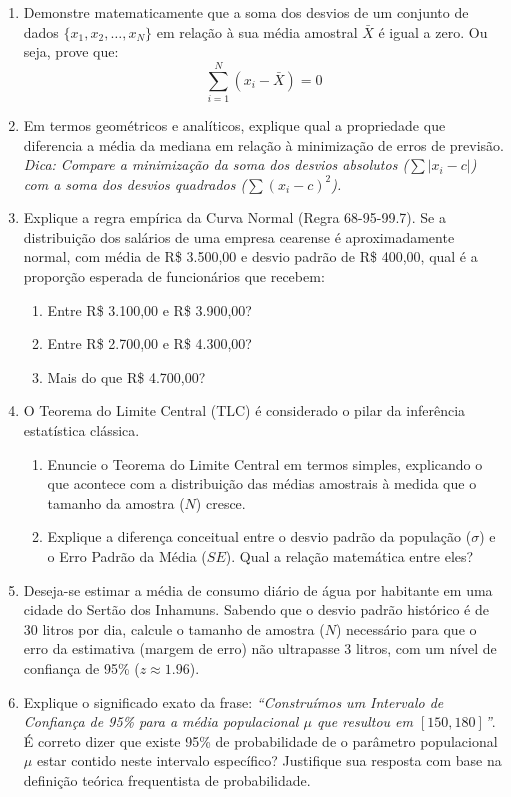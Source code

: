 \documentclass[12pt]{article}
\begin{document}
\begin{enumerate}[label=\textbf{Questão \arabic*}]
    \item Demonstre matematicamente que a soma dos desvios de um conjunto de dados $\{x_1, x_2, \dots, x_N\}$ em relação à sua média amostral $\bar{X}$ é igual a zero. Ou seja, prove que:
    $$\sum_{i=1}^{N} (x_i - \bar{X}) = 0$$

    \item Em termos geométricos e analíticos, explique qual a propriedade que diferencia a média da mediana em relação à minimização de erros de previsão. \\
    \textit{Dica: Compare a minimização da soma dos desvios absolutos ($\sum |x_i - c|$) com a soma dos desvios quadrados ($\sum (x_i - c)^2$).}

    \item Explique a regra empírica da Curva Normal (Regra 68-95-99.7). Se a distribuição dos salários de uma empresa cearense é aproximadamente normal, com média de R\$ 3.500,00 e desvio padrão de R\$ 400,00, qual é a proporção esperada de funcionários que recebem:
    \begin{enumerate}[label=\alph*)]
        \item Entre R\$ 3.100,00 e R\$ 3.900,00?
        \item Entre R\$ 2.700,00 e R\$ 4.300,00?
        \item Mais do que R\$ 4.700,00?
    \end{enumerate}

    \item O Teorema do Limite Central (TLC) é considerado o pilar da inferência estatística clássica. 
    \begin{enumerate}[label=\alph*)]
        \item Enuncie o Teorema do Limite Central em termos simples, explicando o que acontece com a distribuição das médias amostrais à medida que o tamanho da amostra ($N$) cresce.
        \item Explique a diferença conceitual entre o desvio padrão da população ($\sigma$) e o Erro Padrão da Média ($SE$). Qual a relação matemática entre eles?
    \end{enumerate}

    \item Deseja-se estimar a média de consumo diário de água por habitante em uma cidade do Sertão dos Inhamuns. Sabendo que o desvio padrão histórico é de 30 litros por dia, calcule o tamanho de amostra ($N$) necessário para que o erro da estimativa (margem de erro) não ultrapasse 3 litros, com um nível de confiança de 95\% ($z \approx 1.96$).

    \item Explique o significado exato da frase: \textit{``Construímos um Intervalo de Confiança de 95\% para a média populacional $\mu$ que resultou em $[150, 180]$''}. \\
    É correto dizer que existe 95\% de probabilidade de o parâmetro populacional $\mu$ estar contido neste intervalo específico? Justifique sua resposta com base na definição teórica frequentista de probabilidade.
\end{enumerate}
\end{document}
